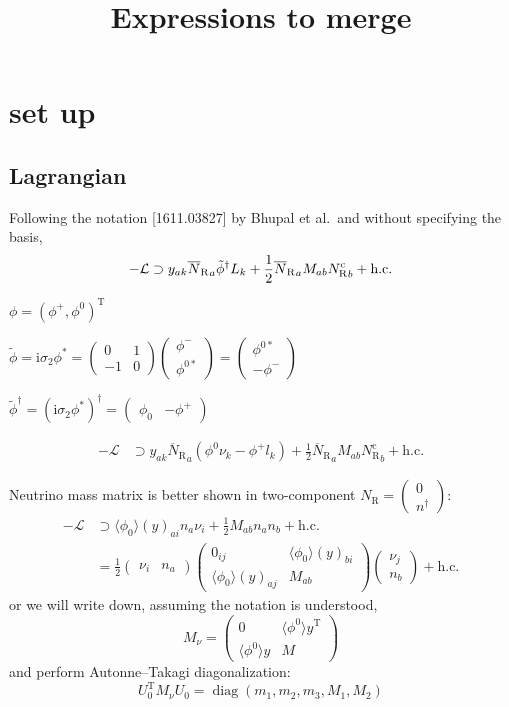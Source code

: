 \documentclass[a4paper,11pt]{scrartcl}
\title{Expressions to merge}
\numberwithin{equation}{section}
\newcommand\w[1]{_{\mathrm{#1}}}
\newcommand\ii{\mathrm{i}}
\newcommand\pmat[1]{\begin{pmatrix}#1\end{pmatrix}}
\newcommand\vev[1]{\langle#1\rangle}
\newcommand\YN{y}
\newcommand\NR{{N\w R}}
\newcommand\NRbar{{\overline N\w R}}
\newcommand\NRc{{N\w R^{\mathrm c}}}
\newcommand{\trans}{^{\mathrm T}}
\newcommand{\spmat}[1]{\left(\begin{smallmatrix}#1\end{smallmatrix}\right)}
\DeclareMathOperator{\diag}{\mathrm{diag}}
\begin{document}
\section{set up}
\subsection{Lagrangian}
Following the notation [1611.03827] by Bhupal et al.\ and without specifying the basis,
\begin{equation}
 -\mathcal L \supset \YN_{ak} \NRbar_a \tilde\phi^\dagger L_k + \frac12 \NRbar_a M_{ab} \NRc_b + \text{h.c.}
\\
\end{equation}

$\phi = (\phi^+, \phi^0)\trans$

$\tilde\phi=\ii\sigma_2\phi^* = \spmat{0&1\\-1&0}\spmat{\phi^-\\\phi^{0*}} = \spmat{\phi^{0*}\\-\phi^-}$

$\tilde\phi^\dagger=(\ii\sigma_2\phi^*)^\dagger = \pmat{\phi_0 & -\phi^+}$


\begin{align}
  -\mathcal L &\supset \YN_{ak} \NRbar_a (\phi^{0}\nu_k-\phi^+l_k) + \frac12 \NRbar_a M_{ab} \NRc_b + \text{h.c.}
\end{align}




Neutrino mass matrix is better shown in two-component $\NR=\spmat{0\\n^\dagger}$:
\begin{align}
  -\mathcal L &
\supset \vev{\phi_0}(\YN)_{ai} n_a\nu_i + \frac12 M_{ab}n_an_b + \text{h.c.}\\
&=
\frac12\pmat{\nu_i & n_a}
\pmat{
 0_{ij} & \vev{\phi_0}(\YN)_{bi} \\
 \vev{\phi_0}(\YN)_{aj} & M_{ab}
}
\pmat{\nu_j \\ n_b} + \text{h.c.}
\end{align}
or we will write down, assuming the notation is understood,
\begin{equation}
 M_\nu = \pmat{
   0 & \vev{\phi^0}\YN\trans\\
   \vev{\phi^0}\YN & M
}
\end{equation}
and perform Autonne--Takagi diagonalization:
\begin{equation}
 U_0\trans M_\nu U_0 = \diag(m_1, m_2, m_3, M_1, M_2)
\end{equation}
\end{document}
